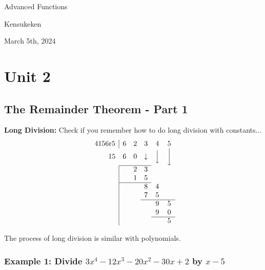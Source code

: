 \documentclass{article}
\begin{document}
\begin{titlepage}
    \centering
    \vspace*{2cm}
    {\LARGE \textcolor{lessoncolor}{Advanced Functions}}\par
    \vspace{1cm}
    {\large Kensukeken}\par
    \vspace{2cm}
    {\large March 5th, 2024}\par
    \vspace{3cm}
\end{titlepage}
\tableofcontents
\newpage

\section{Unit 2}

\subsection{The Remainder Theorem - Part 1}
\textbf{Long Division:}
Check if you remember how to do long division with constants...
\[
\begin{array}{c|ccccc}
4156 \text{r} 5 & 6 & 2 & 3 & 4 & 5 \\
\multicolumn{1}{r}{15} & 6 & 0 & \downarrow & \Big\downarrow & \bigg\downarrow \\
\cline{2-4}
 &  & 2 & 3 &  \\
 & & 1 & 5 &  \\
\cline{2-4}
 &  &  & 8 & 4 \\
 &  & & 7 & 5\\
\cline{4-6}
 &  &  &  & 9 & 5 \\
 &  &  &  & 9 & 0 \\
\cline{5-6}
 &  &  &  & & 5 \\
\end{array}
\]



The process of long division is similar with polynomials.
\subsubsection*{Example 1: Divide $3x^4-12x^3-20x^2-30x+2$ by $x-5$}
\end{document}
